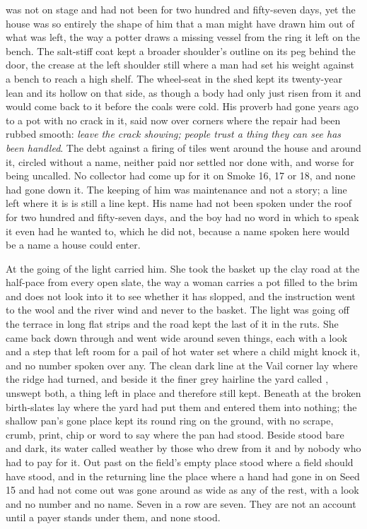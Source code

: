  was not on stage and had not been for two hundred and fifty-seven days, yet the house was so entirely the shape of him that a man might have drawn him out of what was left, the way a potter draws a missing vessel from the ring it left on the bench. The salt-stiff coat kept a broader shoulder's outline on its peg behind the door, the crease at the left shoulder still where a man had set his weight against a bench to reach a high shelf. The wheel-seat in the shed kept its twenty-year lean and its hollow on that side, as though a body had only just risen from it and would come back to it before the coals were cold. His proverb had gone years ago to a pot with no crack in it, said now over corners where the repair had been rubbed smooth: \emph{leave the crack showing; people trust a thing they can see has been handled}. The debt against a firing of tiles went around the house and around it, circled without a name, neither paid nor settled nor done with, and worse for being uncalled. No collector had come up  for it on Smoke 16, 17 or 18, and none had gone down it. The keeping of him was maintenance and not a story; a line left where it is is still a line kept. His name had not been spoken under the roof for two hundred and fifty-seven days, and the boy had no word in which to speak it even had he wanted to, which he did not, because a name spoken here would be a name a house could enter.

\scenebreak

At the going of the light  carried him. She took the basket up the clay road at the half-pace from every open slate, the way a woman carries a pot filled to the brim and does not look into it to see whether it has slopped, and the instruction went to the wool and the river wind and never to the basket. The light was going off the terrace in long flat strips and the road kept the last of it in the ruts. She came back down through  and went wide around seven things, each with a look and a step that left room for a pail of hot water set where a child might knock it, and no number spoken over any. The clean dark line at the Vail corner lay where the  ridge had turned, and beside it the finer grey hairline the yard called , unswept both, a thing left in place and therefore still kept. Beneath  at  the broken birth-slates lay where the yard had put them and entered them into nothing; the shallow pan's gone place kept its round ring on the ground, with no scrape, crumb, print, chip or word to say where the pan had stood. Beside   stood bare and dark, its water called weather by those who drew from it and by nobody who had to pay for it. Out past  on  the field's empty place stood where a field should have stood, and in the returning line the place where a hand had gone in on Seed 15 and had not come out was gone around as wide as any of the rest, with a look and no number and no name. Seven in a row are seven. They are not an account until a payer stands under them, and none stood.

